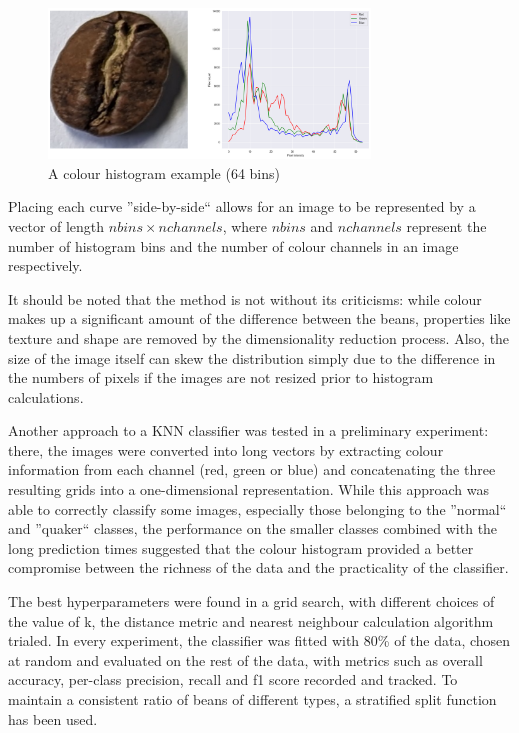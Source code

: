 \begin{figure}[h]
    \centering
    \includegraphics[height=4cm, keepaspectratio]{figures/methodology/histogramExample}
    \caption[Colour histogram example]{A colour histogram example (64 bins)}
    \label{fig:histExample}
\end{figure}
Placing each curve ''side-by-side`` allows for an image to be represented by a vector of length $nbins \times nchannels$,
where $nbins$ and $nchannels$ represent the number of histogram bins and the number of colour channels in an image respectively.

It should be noted that the method is not without its criticisms: while colour makes up a significant amount of the difference
between the beans, properties like texture and shape are removed by the dimensionality reduction process.
Also, the size of the image itself can skew the distribution simply due to the difference in the numbers of pixels if the
images are not resized prior to histogram calculations.

Another approach to a KNN classifier was tested in a preliminary experiment:
there, the images were converted into long vectors by extracting colour information from each channel (red, green or blue)
and concatenating the three resulting grids into a one-dimensional representation.
While this approach was able to correctly classify some images, especially those belonging to the ''normal`` and ''quaker``
classes, the performance on the smaller classes combined with the long prediction times suggested that the colour histogram
provided a better compromise between the richness of the data and the practicality of the classifier.

The best hyperparameters were found in a grid search, with different choices of the value of k, the distance metric
and nearest neighbour calculation algorithm trialed.
In every experiment, the classifier was fitted with 80\% of the data, chosen at random and evaluated on the rest of the data,
with metrics such as overall accuracy, per-class precision, recall and f1 score recorded and tracked.
To maintain a consistent ratio of beans of different types, a stratified split function has been used.

